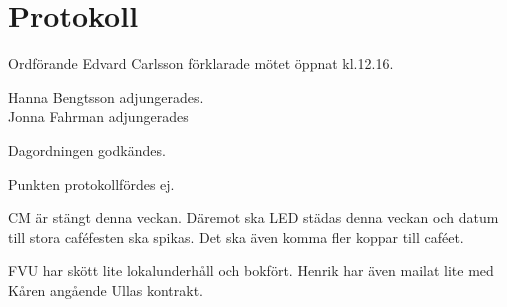 \documentclass[10pt]{article}
\def\mo{Edvard Carlsson}
\begin{document}
\section*{Protokoll}
\begin{paragrafer}
Ordförande {\mo} förklarade mötet öppnat kl.12.16.

{\valavmo}

{\valavms}

{\valavj}

{\tosg}

Hanna Bengtsson adjungerades. \\
Jonna Fahrman adjungerades





Dagordningen godkändes.



\begin{fyllnadsval} %
\end{fyllnadsval}

\begin{paragrafer}
Punkten protokollfördes ej.


CM är stängt denna veckan. Däremot ska LED städas denna veckan och datum till stora caféfesten ska spikas. Det ska även komma 
    fler koppar till caféet.

FVU har skött lite lokalunderhåll och bokfört. Henrik har även mailat lite med Kåren angående Ullas kontrakt.


\end{paragrafer}
\end{paragrafer}
\end{document}
